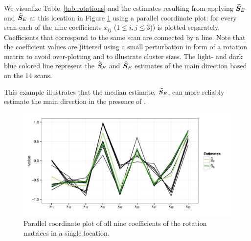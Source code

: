   
We visualize Table~\ref{tab:rotations} and the estimates resulting from applying ${\widetilde{\bm S}_E}$ and ${\widehat{\bm S}_E}$ at this location in Figure \ref{fig:pcp} using a parallel coordinate plot: for every scan each of the nine coefficients $x_{ij}$ ($1 \le i,j \le 3$)) is plotted separately. Coefficients that correspond to the same scan are connected by a line.   Note that the coefficient values are jittered using a small perturbation in form of a rotation matrix to avoid over-plotting and to illustrate cluster sizes. The light- and dark blue colored line represent the ${\widetilde{\bm S}_E}$ and ${\widehat{\bm S}_E}$ estimates of the main direction based on the 14 scans.   

This example  illustrates that the median estimate, ${\widetilde{\bm S}_E}$,  can more reliably estimate the main direction in the presence of .



\begin{figure}[htbp] %
   \centering
   \includegraphics[width=.7\textwidth]{images/pcp.pdf} 
   \caption{ \label{fig:pcp}Parallel coordinate plot of all nine coefficients of the rotation matrices in a single location. }
\end{figure}

